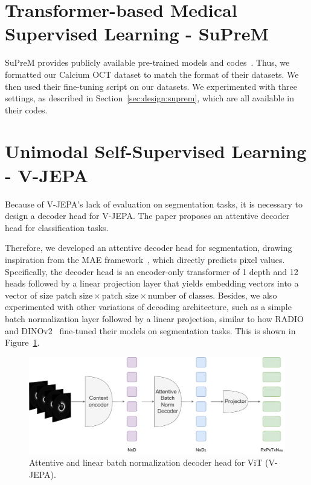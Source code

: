 \documentclass[a4paper,11pt,oneside]{report}
\begin{document}
\section{Transformer-based Medical Supervised Learning - SuPreM}
SuPreM provides publicly available pre-trained models and codes~\cite{Li2024}. Thus, we formatted our Calcium OCT dataset to match the format of their datasets. We then used their fine-tuning script on our datasets. We experimented with three settings, as described in Section~\ref{sec:design:suprem}, which are all available in their codes.

\section{Unimodal Self-Supervised Learning - V-JEPA}\label{sec:implementation:vjepa}
Because of V-JEPA's lack of evaluation on segmentation tasks, it is necessary to design a decoder head for V-JEPA. The paper proposes an attentive decoder head for classification tasks. 

Therefore, we developed an attentive decoder head for segmentation, drawing inspiration from the MAE framework~\cite{He2022}, which directly predicts pixel values. Specifically, the decoder head is an encoder-only transformer of 1 depth and 12 heads followed by a linear projection layer that yields embedding vectors into a vector of size \(\text{patch size} \times \text{patch size} \times \text{number of classes}\). Besides, we also experimented with other variations of decoding architecture, such as a simple batch normalization layer followed by a linear projection, similar to how RADIO~\cite{Ranzinger2024RADIO} and DINOv2~\cite{Oquab2024dinov} fine-tuned their models on segmentation tasks. This is shown in Figure~\ref{fig:vjepa-attentive-and-batchnorm-decoder-head}. 

\begin{figure}[ht]
    \centering
    \includegraphics[width=0.6\linewidth]{figures/fig_implementation_vjepa_attentive_and_batchnorm_decoder.pdf}
    \caption{Attentive and linear batch normalization decoder head for ViT (V-JEPA).}
    \label{fig:vjepa-attentive-and-batchnorm-decoder-head}
\end{figure}%
\end{document}
